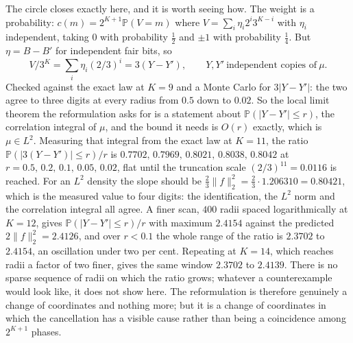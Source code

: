 \documentclass[11pt]{article}
\theoremstyle{remark}
\begin{document}
The circle closes exactly here, and it is worth seeing how. The weight is a probability: $c(m)=2^{K+1}
\mathbb P(V=m)$ where $V=\sum_i\eta_i2^i3^{K-i}$ with $\eta_i$ independent, taking $0$ with probability
$\tfrac12$ and $\pm1$ with probability $\tfrac14$. But $\eta=B-B'$ for independent fair bits, so
\[
  V/3^K=\sum_i\eta_i(2/3)^i=3(Y-Y'),\qquad Y,Y'\ \text{independent copies of}\ \mu .
\]
Checked against the exact law at $K=9$ and a Monte Carlo for $3|Y-Y'|$: the two agree to three digits at
every radius from $0.5$ down to $0.02$. So the local limit theorem the reformulation asks for is a
statement about $\mathbb P(|Y-Y'|\le r)$, the correlation integral of $\mu$, and the bound it needs is
$O(r)$ exactly, which is $\mu\in L^2$. Measuring that integral from the exact law at $K=11$, the ratio
$\mathbb P(|3(Y-Y')|\le r)/r$ is $0.7702,\,0.7969,\,0.8021,\,0.8038,\,0.8042$ at
$r=0.5,\,0.2,\,0.1,\,0.05,\,0.02$, flat until the truncation scale $(2/3)^{11}=0.0116$ is reached. For an
$L^2$ density the slope should be $\tfrac23\|f\|_2^2=\tfrac23\cdot1.206310=0.80421$, which is the
measured value to four digits: the identification, the $L^2$ norm and the correlation integral all agree.
A finer scan, $400$ radii spaced logarithmically at $K=12$, gives $\mathbb P(|Y-Y'|\le r)/r$ with maximum
$2.4154$ against the predicted $2\|f\|_2^2=2.4126$, and over $r<0.1$ the whole range of the ratio is
$2.3702$ to $2.4154$, an oscillation under two per cent. Repeating at $K=14$, which reaches radii a factor of two finer, gives the same
window $2.3702$ to $2.4139$. There is no sparse sequence of radii on which the ratio grows; whatever a
counterexample would look like, it does not show here. The reformulation is therefore genuinely a change of coordinates
and nothing more; but it is a change of coordinates in which the cancellation has a visible cause rather
than being a coincidence among $2^{K+1}$ phases.
\end{document}
